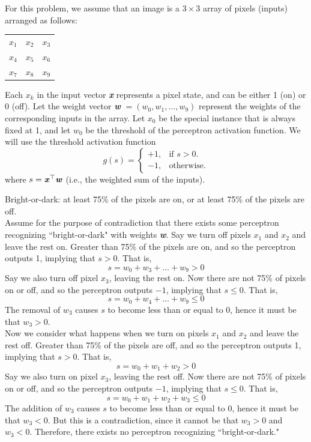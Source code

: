 \documentclass[solution, letterpaper]{cs121}
\begin{document}

 For this problem, we assume that an image is a $3 \times 3$ array of pixels (inputs) arranged as follows:
\begin{center}
\begin{tabular}{ l c r }
  $x_1$ & $x_2$ & $x_3$ \\
  $x_4$ & $x_5$ & $x_6$ \\
  $x_7$ & $x_8$ & $x_9$ \\
\end{tabular}
\end{center}
Each $x_k$ in the input vector {\textbf{\emph{x}}} represents a pixel state, and can be either 1 (on) or 0 (off). Let the weight vector {\textbf{\emph{w}}} $= (w_0, w_1, \ldots, w_9)$ represent the weights of the corresponding inputs in the array. Let $x_0$ be the special instance that is always fixed at 1, and let $w_0$ be the threshold of the perceptron activation function. We will use the threshold activation function 
\begin{equation*}
  g(s)=\begin{cases}
    +1, & \text{if $s  >  0$}.\\
    -1, & \text{otherwise}.
  \end{cases}
\end{equation*}
where $s = {\textbf{\emph{x}}}^\top{\textbf{\emph{w}}}$ (i.e., the weighted sum of the inputs).

\subproblem Bright-or-dark: at least 75\% of the pixels are on, or at least 75\% of the pixels are off. \\

Assume for the purpose of contradiction that there exists some perceptron recognizing ``bright-or-dark" with weights {\textbf{\emph{w}}}. Say we turn off pixels $x_1$ and $x_2$ and leave the rest on. Greater than 75\% of the pixels are on, and so the perceptron outputs 1, implying that $s > 0$. That is,
\[ s = w_0 + w_3 + \ldots + w_9 > 0 \]
Say we also turn off pixel $x_3$, leaving the rest on. Now there are not 75\% of pixels on or off, and so the perceptron outputs $-1$, implying that $s \leq 0$. That is,
\[ s = w_0 + w_4 + \ldots + w_9 \leq 0 \]
The removal of $w_3$ causes $s$ to become less than or equal to 0, hence it must be that $w_3 > 0$. \\

Now we consider what happens when we turn on pixels $x_1$ and $x_2$ and leave the rest off. Greater than 75\% of the pixels are off, and so the perceptron outputs 1, implying that $s > 0$. That is,
\[ s = w_0 + w_1 + w_2 > 0 \]
Say we also turn on pixel $x_3$, leaving the rest off. Now there are not 75\% of pixels on or off, and so the perceptron outputs $-1$, implying that $s \leq 0$. That is,
\[ s = w_0 + w_1 + w_2 + w_3 \leq 0 \]
The addition of $w_3$ causes $s$ to become less than or equal to 0, hence it must be that $w_3 < 0$. But this is a contradiction, since it cannot be that $w_3 > 0$ and $w_3 < 0$. Therefore, there exists no perceptron recognizing ``bright-or-dark."
\end{document}
